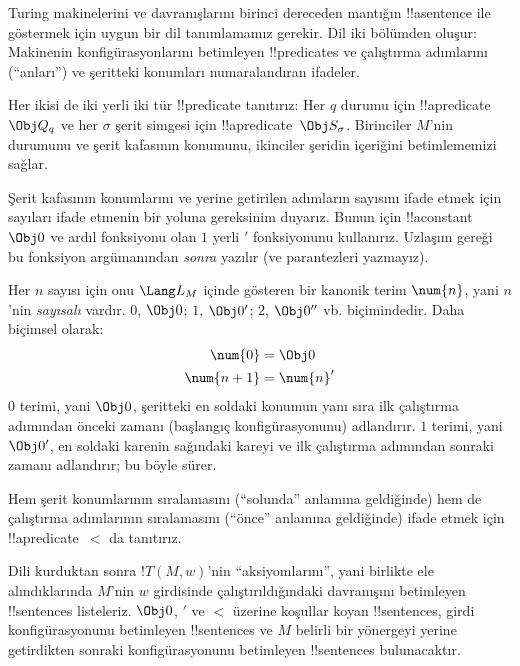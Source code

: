 


\begin{explain}
Turing makinelerini ve davranışlarını birinci dereceden mantığın
!!a{sentence} ile göstermek için uygun bir dil tanımlamamız gerekir. Dil iki
bölümden oluşur: Makinenin konfigürasyonlarını betimleyen !!{predicate}s ve
çalıştırma adımlarını (``anları'') ve şeritteki konumları numaralandıran
ifadeler.

Her ikisi de iki yerli iki tür !!{predicate} tanıtırız: Her $q$ durumu
için !!a{predicate}~$\Obj Q_q$ ve her $\sigma$ şerit simgesi için
!!a{predicate}~$\Obj S_\sigma$. Birinciler $M$'nin durumunu ve şerit kafasının
konumunu, ikinciler şeridin içeriğini betimlememizi sağlar.

Şerit kafasının konumlarını ve yerine getirilen adımların sayısını ifade etmek
için sayıları ifade etmenin bir yoluna gereksinim duyarız. Bunun için
!!a{constant}~$\Obj 0$ ve ardıl fonksiyonu olan $1$ yerli $\prime$
fonksiyonunu kullanırız. Uzlaşım gereği bu fonksiyon argümanından \emph{sonra}
yazılır (ve parantezleri yazmayız).

Her $n$ sayısı için onu $\Lang L_M$ içinde gösteren bir kanonik terim
$\num{n}$, yani $n$'nin \emph{sayısalı} vardır. $\num{0}$, $\Obj 0$;
$\num{1}$, $\Obj 0'$; $\num{2}$, $\Obj 0''$ vb. biçimindedir. Daha biçimsel
olarak:
\begin{align*}
\num{0} & = \Obj 0 \\
\num{n+1} &= \num{n}'
\end{align*}
$\num{0}$ terimi, yani $\Obj 0$, şeritteki en soldaki konumun yanı sıra ilk
çalıştırma adımından önceki zamanı (başlangıç konfigürasyonunu) adlandırır.
$\num{1}$ terimi, yani $\Obj 0'$, en soldaki karenin sağındaki kareyi ve ilk
çalıştırma adımından sonraki zamanı adlandırır; bu böyle sürer.

Hem şerit konumlarının sıralamasını (``solunda'' anlamına geldiğinde) hem de
çalıştırma adımlarının sıralamasını (``önce'' anlamına geldiğinde) ifade etmek
için !!a{predicate}~$<$ da tanıtırız.

Dili kurduktan sonra $!T(M,w)$'nin ``aksiyomlarını'', yani birlikte ele
alındıklarında $M$'nin $w$ girdisinde çalıştırıldığındaki davranışını
betimleyen !!{sentence}s listeleriz. $\Obj 0$, $\prime$ ve $<$ üzerine
koşullar koyan !!{sentence}s, girdi konfigürasyonunu betimleyen !!{sentence}s
ve $M$ belirli bir yönergeyi yerine getirdikten sonraki konfigürasyonunu
betimleyen !!{sentence}s bulunacaktır.
\end{explain}

